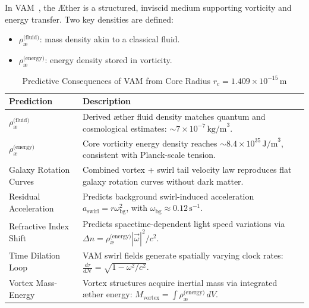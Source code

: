 \documentclass[12pt]{article}
\begin{document}
    In VAM~\cite{iskandarani2025vam2}, the \AE{}ther is a structured, inviscid medium supporting vorticity and energy transfer. Two key densities are defined:
    \begin{itemize}
        \item $\rho_{\text{\ae}}^{\text{(fluid)}}$: mass density akin to a classical fluid.
        \item $\rho_{\text{\ae}}^{\text{(energy)}}$: energy density stored in vorticity.
    \end{itemize}

    \begin{table}[H]
        \footnotesize
        \centering
        \renewcommand{\arraystretch}{1.2}
        \begin{tabular}{|l|p{10.5cm}|}
            \hline
            \textbf{Prediction} & \textbf{Description} \\
            \hline
            \(\rho_{\text{\ae}}^{\text{(fluid)}}\) & Derived æther fluid density matches quantum and cosmological estimates: \( \sim 7 \times 10^{-7} \, \text{kg/m}^3 \). \\
            \hline
            \(\rho_{\text{\ae}}^{\text{(energy)}}\) & Core vorticity energy density reaches \( \sim 8.4 \times 10^{35} \, \text{J/m}^3 \), consistent with Planck-scale tension. \\
            \hline
            Galaxy Rotation Curves & Combined vortex + swirl tail velocity law reproduces flat galaxy rotation curves without dark matter. \\
            \hline
            Residual Acceleration & Predicts background swirl-induced acceleration \( a_{\text{swirl}} = r \omega_{\text{bg}}^2 \), with \( \omega_{\text{bg}} \approx 0.12 \, \text{s}^{-1} \). \\
            \hline
            Refractive Index Shift & Predicts spacetime-dependent light speed variations via \( \Delta n = \rho_{\text{\ae}}^{\text{(energy)}} |\vec{\omega}|^2 / c^2 \). \\
            \hline
            Time Dilation Loop & VAM swirl fields generate spatially varying clock rates: \( \frac{d\tau}{d\mathcal{N}} = \sqrt{1 - \omega^2/c^2} \). \\
            \hline
            Vortex Mass-Energy & Vortex structures acquire inertial mass via integrated æther energy: \( M_{\text{vortex}} = \int \rho_{\text{\ae}}^{\text{(energy)}} \, dV \). \\
            \hline
        \end{tabular}
        \caption{Predictive Consequences of VAM from Core Radius \( r_c = 1.409 \times 10^{-15} \, \text{m} \)}
        \label{tab:vam_predictions}
    \end{table}
\end{document}
